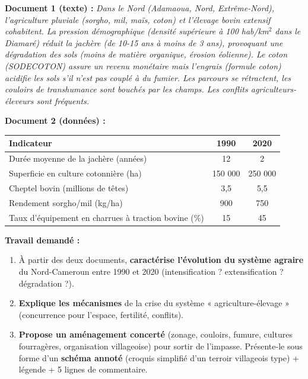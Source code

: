 \documentclass[11pt]{article}
\begin{document}
\begin{exercice}
\textbf{Document 1 (texte) :} \emph{Dans le Nord (Adamaoua, Nord, Extrême-Nord), l'agriculture pluviale (sorgho, mil, maïs, coton) et l'élevage bovin extensif cohabitent. La pression démographique (densité supérieure à 100 hab/km$^2$ dans le Diamaré) réduit la jachère (de 10-15 ans à moins de 3 ans), provoquant une dégradation des sols (moins de matière organique, érosion éolienne). Le coton (SODECOTON) assure un revenu monétaire mais l'engrais (formule coton) acidifie les sols s'il n'est pas couplé à du fumier. Les parcours se rétractent, les couloirs de transhumance sont bouchés par les champs. Les conflits agriculteurs-éleveurs sont fréquents.}

\textbf{Document 2 (données) :}
\begin{center}
\begin{tabular}{|l|c|c|}
\hline
\textbf{Indicateur} & \textbf{1990} & \textbf{2020} \\
\hline
Durée moyenne de la jachère (années) & 12 & 2 \\
\hline
Superficie en culture cotonnière (ha) & 150 000 & 250 000 \\
\hline
Cheptel bovin (millions de têtes) & 3,5 & 5,5 \\
\hline
Rendement sorgho/mil (kg/ha) & 900 & 750 \\
\hline
Taux d'équipement en charrues à traction bovine (\%) & 15 & 45 \\
\hline
\end{tabular}
\end{center}

\textbf{Travail demandé :}
\begin{enumerate}
\item À partir des deux documents, \textbf{caractérise l'évolution du système agraire} du Nord-Cameroun entre 1990 et 2020 (intensification ? extensification ? dégradation ?).
\item \textbf{Explique les mécanismes} de la crise du système « agriculture-élevage » (concurrence pour l'espace, fertilité, conflits).
\item \textbf{Propose un aménagement concerté} (zonage, couloirs, fumure, cultures fourragères, organisation villageoise) pour sortir de l'impasse. Présente-le sous forme d'un \textbf{schéma annoté} (croquis simplifié d'un terroir villageois type) + légende + 5 lignes de commentaire.
\end{enumerate}
\end{exercice}
\end{document}
